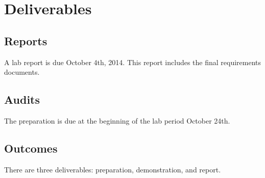 \documentclass{article}
\begin{document}
\section{Deliverables}

	\subsection{Reports}
		A lab report is due October 4th, 2014. This report includes the final requirements documents.
	\subsection{Audits}
		The preparation is due at the beginning of the lab period October 24th.
	\subsection{Outcomes}
		There are three deliverables: preparation, demonstration, and report.
\end{document}
